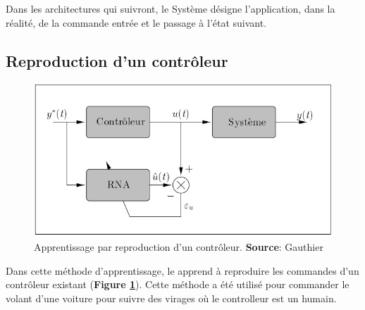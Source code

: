 Dans les architectures qui suivront, le Système désigne l'application, dans la réalité, de la commande entrée et le passage à l'état suivant.

\subsection{Reproduction d'un contrôleur}
\begin{figure}
 \centering
 \includegraphics[scale=0.5]{../figures/appsimple.jpg}
 \caption{Apprentissage par reproduction d'un contrôleur. \textbf{Source}: Gauthier\cite{Gauthier}}
 \label{appcontroleur}
\end{figure}
Dans cette méthode d'apprentissage, le \rna apprend à reproduire les commandes d'un contrôleur existant (\textbf{Figure \ref{appcontroleur}}).
Cette méthode a été utilisé pour commander le volant d'une voiture pour suivre des virages où le controlleur est un humain.\cite{Pomerleau}

